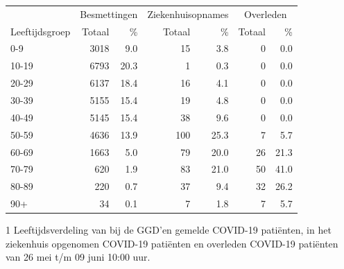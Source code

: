 \documentclass[
  english,
  man,floatsintext]{apa6}
\begin{document}
\begin{table}
\centering\begingroup\fontsize{11}{13}\selectfont

\begin{threeparttable}
\begin{tabular}{lrrrrrr}
\toprule
\multicolumn{1}{c}{ } & \multicolumn{2}{c}{Besmettingen} & \multicolumn{2}{c}{Ziekenhuisopnames} & \multicolumn{2}{c}{Overleden} \\
\cmidrule(l{3pt}r{3pt}){2-3} \cmidrule(l{3pt}r{3pt}){4-5} \cmidrule(l{3pt}r{3pt}){6-7}
Leeftijdsgroep & Totaal & \% & Totaal & \% & Totaal & \%\\
\midrule
0-9 & 3018 & 9.0 & 15 & 3.8 & 0 & 0.0\\
10-19 & 6793 & 20.3 & 1 & 0.3 & 0 & 0.0\\
20-29 & 6137 & 18.4 & 16 & 4.1 & 0 & 0.0\\
30-39 & 5155 & 15.4 & 19 & 4.8 & 0 & 0.0\\
40-49 & 5145 & 15.4 & 38 & 9.6 & 0 & 0.0\\
50-59 & 4636 & 13.9 & 100 & 25.3 & 7 & 5.7\\
60-69 & 1663 & 5.0 & 79 & 20.0 & 26 & 21.3\\
70-79 & 620 & 1.9 & 83 & 21.0 & 50 & 41.0\\
80-89 & 220 & 0.7 & 37 & 9.4 & 32 & 26.2\\
90+ & 34 & 0.1 & 7 & 1.8 & 7 & 5.7\\
\bottomrule
\end{tabular}
\begin{tablenotes}
\item[1] Leeftijdsverdeling van bij de GGD’en gemelde COVID-19 patiënten, in het ziekenhuis opgenomen COVID-19 patiënten en overleden COVID-19 patiënten van 26 mei t/m 09 juni 10:00 uur.
\end{tablenotes}
\end{threeparttable}
\endgroup{}
\end{table}

\newpage
\end{document}
